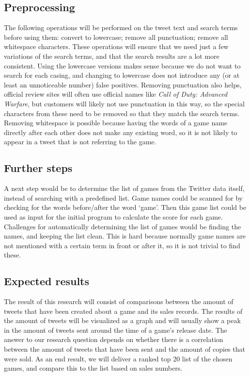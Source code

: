 \subsection{Preprocessing}
The following operations will be performed on the tweet text and search terms before using them:
convert to lowercase;
remove all punctuation;
remove all whitespace characters.
These operations will ensure that we need just a few variations of the search terms, and that the search results are a lot more consistent. Using the lowercase versions makes sense because we do not want to search for each casing, and changing to lowercase does not introduce any (or at least an unnoticeable number) false positives. Removing punctuation also helps, official review sites will often use official names like \textit{Call of Duty: Advanced Warfare}, but customers will likely not use punctuation in this way, so the special characters from these need to be removed so that they match the search terms. Removing whitespace is possible because having the words of a game name directly after each other does not make any existing word, so it is not likely to appear in a tweet that is not referring to the game.
\subsection{Further steps}
A next step would be to determine the list of games from the Twitter data itself, instead of searching with a predefined list. Game names could be scanned for by checking for the words before/after the word ‘game’. Then this game list could be used as input for the initial program to calculate the score for each game. Challenges for automatically determining the list of games would be finding the names, and keeping the list clean. This is hard because normally game names are not mentioned with a certain term in front or after it, so it is not trivial to find these.
\subsection{Expected results}
The result of this research will consist of comparisons between the amount of tweets that have been created about a game and its sales records. The results of the amount of tweets will be visualized as a graph and will usually show a peak in the amount of tweets sent around the time of a game’s release date. The answer to our research question depends on whether there is a correlation between the amount of tweets that have been sent and the amount of copies that were sold. As an end result, we will deliver a ranked top 20 list of the chosen games, and compare this to the list based on sales numbers.


